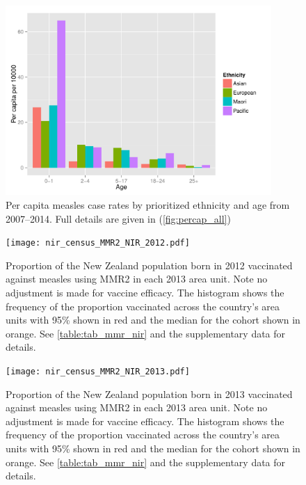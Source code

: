 \documentclass{article}
\begin{document}
\begin{figure}[H]
     \begin{center}
     \includegraphics[width=0.9\textwidth]{percap_eth_age.pdf}
     \end{center}
     \caption{Per capita measles case rates by prioritized ethnicity and age from 2007--2014. Full details are given in (\autoref{fig:percap_all})}
     \label{fig:PerCapAgeEth}
\end{figure}
% 

\begin{figure}
\begin{center}
    \texttt{[image: nir\_census\_MMR2\_NIR\_2012.pdf]}
 \end{center}
    \caption{Proportion of the New Zealand population born in 2012 vaccinated against measles using MMR2 in each 2013 area unit. Note no adjustment is made for vaccine efficacy. The histogram shows the frequency of the proportion vaccinated across the country's area units with 95\% shown in red and the median for the cohort shown in orange. See \autoref{table:tab_mmr_nir} and the supplementary data for details.}
\label{fig:fig22012}
\end{figure}

\begin{figure}
\begin{center}
    \texttt{[image: nir\_census\_MMR2\_NIR\_2013.pdf]}
\end{center}
\caption{Proportion of the New Zealand population born in 2013 vaccinated against measles using MMR2 in each 2013 area unit. Note no adjustment is made for vaccine efficacy. The histogram shows the frequency of the proportion vaccinated across the country's area units with 95\% shown in red and the median for the cohort shown in orange. See \autoref{table:tab_mmr_nir} and the supplementary data for details.}
\label{fig:fig22013}
\end{figure}
\end{document}
